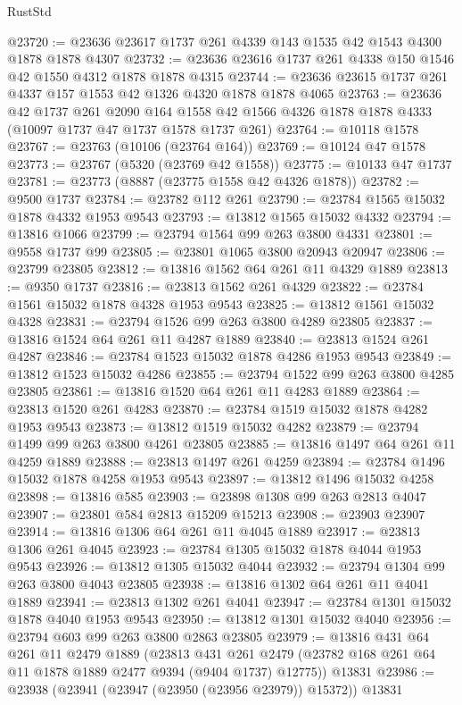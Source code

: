\begin{lexlean}{RustStd}
\begin{coremodule}
@23720 := @23636 @23617 @1737 @261 @4339 @143 @1535 @42 @1543 @4300 @1878 @1878 @4307
@23732 := @23636 @23616 @1737 @261 @4338 @150 @1546 @42 @1550 @4312 @1878 @1878 @4315
@23744 := @23636 @23615 @1737 @261 @4337 @157 @1553 @42 @1326 @4320 @1878 @1878 @4065
@23763 := @23636
    @42
    @1737
    @261
    @2090
    @164
    @1558
    @42
    @1566
    @4326
    @1878
    @1878
    @4333
    (@10097 @1737 @47 @1737 @1578 @1737 @261)
@23764 := @10118 @1578
@23767 := @23763 (@10106 (@23764 @164))
@23769 := @10124 @47 @1578
@23773 := @23767 (@5320 (@23769 @42 @1558))
@23775 := @10133 @47 @1737
@23781 := @23773 (@8887 (@23775 @1558 @42 @4326 @1878))
@23782 := @9500 @1737
@23784 := @23782 @112 @261
@23790 := @23784 @1565 @15032 @1878 @4332 @1953 @9543
@23793 := @13812 @1565 @15032 @4332
@23794 := @13816 @1066
@23799 := @23794 @1564 @99 @263 @3800 @4331
@23801 := @9558 @1737 @99
@23805 := @23801 @1065 @3800 @20943 @20947
@23806 := @23799 @23805
@23812 := @13816 @1562 @64 @261 @11 @4329 @1889
@23813 := @9350 @1737
@23816 := @23813 @1562 @261 @4329
@23822 := @23784 @1561 @15032 @1878 @4328 @1953 @9543
@23825 := @13812 @1561 @15032 @4328
@23831 := @23794 @1526 @99 @263 @3800 @4289 @23805
@23837 := @13816 @1524 @64 @261 @11 @4287 @1889
@23840 := @23813 @1524 @261 @4287
@23846 := @23784 @1523 @15032 @1878 @4286 @1953 @9543
@23849 := @13812 @1523 @15032 @4286
@23855 := @23794 @1522 @99 @263 @3800 @4285 @23805
@23861 := @13816 @1520 @64 @261 @11 @4283 @1889
@23864 := @23813 @1520 @261 @4283
@23870 := @23784 @1519 @15032 @1878 @4282 @1953 @9543
@23873 := @13812 @1519 @15032 @4282
@23879 := @23794 @1499 @99 @263 @3800 @4261 @23805
@23885 := @13816 @1497 @64 @261 @11 @4259 @1889
@23888 := @23813 @1497 @261 @4259
@23894 := @23784 @1496 @15032 @1878 @4258 @1953 @9543
@23897 := @13812 @1496 @15032 @4258
@23898 := @13816 @585
@23903 := @23898 @1308 @99 @263 @2813 @4047
@23907 := @23801 @584 @2813 @15209 @15213
@23908 := @23903 @23907
@23914 := @13816 @1306 @64 @261 @11 @4045 @1889
@23917 := @23813 @1306 @261 @4045
@23923 := @23784 @1305 @15032 @1878 @4044 @1953 @9543
@23926 := @13812 @1305 @15032 @4044
@23932 := @23794 @1304 @99 @263 @3800 @4043 @23805
@23938 := @13816 @1302 @64 @261 @11 @4041 @1889
@23941 := @23813 @1302 @261 @4041
@23947 := @23784 @1301 @15032 @1878 @4040 @1953 @9543
@23950 := @13812 @1301 @15032 @4040
@23956 := @23794 @603 @99 @263 @3800 @2863 @23805
@23979 := @13816
    @431
    @64
    @261
    @11
    @2479
    @1889
    (@23813 @431 @261 @2479 (@23782 @168 @261 @64 @11 @1878 @1889 @2477 @9394 (@9404 @1737) @12775))
    @13831
@23986 := @23938 (@23941 (@23947 (@23950 (@23956 @23979)) @15372)) @13831

\end{coremodule}
\end{lexlean}
